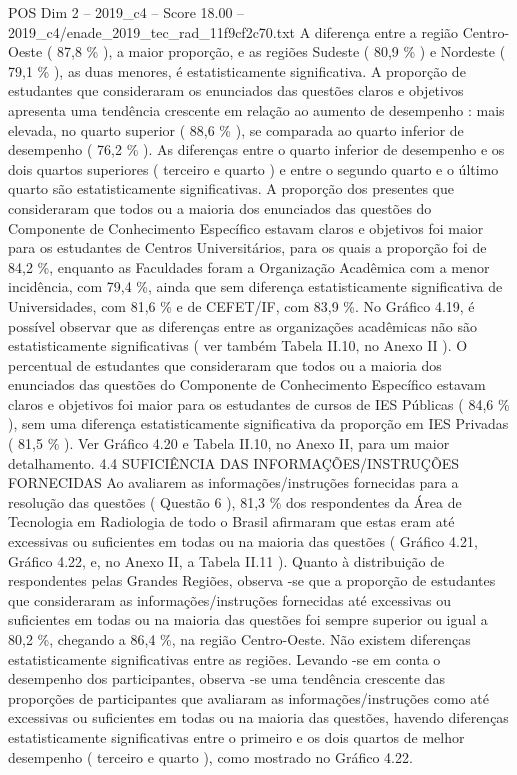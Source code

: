 \begin{textsample}{POS Dim 2 – 2019\_c4 – Score 18.00 – 2019\_c4/enade\_2019\_tec\_rad\_11f9cf2c70.txt}
A diferença entre a região Centro-Oeste ( 87,8 \% ), a maior proporção, e as regiões Sudeste ( 80,9 \% ) e Nordeste ( 79,1 \% ), as duas menores, é estatisticamente significativa.
A proporção de estudantes que consideraram os enunciados das questões claros e objetivos apresenta uma tendência crescente em relação ao aumento de desempenho : mais elevada, no quarto superior ( 88,6 \% ), se comparada ao quarto inferior de desempenho ( 76,2 \% ).
As diferenças entre o quarto inferior de desempenho e os dois quartos superiores ( terceiro e quarto ) e entre o segundo quarto e o último quarto são estatisticamente significativas.
A proporção dos presentes que consideraram que todos ou a maioria dos enunciados das questões do Componente de Conhecimento Específico estavam claros e objetivos foi maior para os estudantes de Centros Universitários, para os quais a proporção foi de 84,2 \%, enquanto as Faculdades foram a Organização Acadêmica com a menor incidência, com 79,4 \%, ainda que sem diferença estatisticamente significativa de Universidades, com 81,6 \% e de CEFET/IF, com 83,9 \%.
No Gráfico 4.19, é possível observar que as diferenças entre as organizações acadêmicas não são estatisticamente significativas ( ver também Tabela II.10, no Anexo II ).
O percentual de estudantes que consideraram que todos ou a maioria dos enunciados das questões do Componente de Conhecimento Específico estavam claros e objetivos foi maior para os estudantes de cursos de IES Públicas ( 84,6 \% ), sem uma diferença estatisticamente significativa da proporção em IES Privadas ( 81,5 \% ).
Ver Gráfico 4.20 e Tabela II.10, no Anexo II, para um maior detalhamento. 4.4 SUFICIÊNCIA DAS INFORMAÇÕES/INSTRUÇÕES FORNECIDAS Ao avaliarem as informações/instruções fornecidas para a resolução das questões ( Questão 6 ), 81,3 \% dos respondentes da Área de Tecnologia em Radiologia de todo o Brasil afirmaram que estas eram até excessivas ou suficientes em todas ou na maioria das questões ( Gráfico 4.21, Gráfico 4.22, e, no Anexo II, a Tabela II.11 ).
Quanto à distribuição de respondentes pelas Grandes Regiões, observa -se que a proporção de estudantes que consideraram as informações/instruções fornecidas até excessivas ou suficientes em todas ou na maioria das questões foi sempre superior ou igual a 80,2 \%, chegando a 86,4 \%, na região Centro-Oeste.
Não existem diferenças estatisticamente significativas entre as regiões.
Levando -se em conta o desempenho dos participantes, observa -se uma tendência crescente das proporções de participantes que avaliaram as informações/instruções como até excessivas ou suficientes em todas ou na maioria das questões, havendo diferenças estatisticamente significativas entre o primeiro e os dois quartos de melhor desempenho ( terceiro e quarto ), como mostrado no Gráfico 4.22.

\end{textsample}
